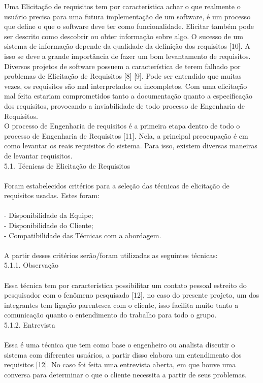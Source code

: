 \tab Uma Elicitação de requisitos tem por característica achar o que realmente o usuário precisa para uma futura implementação de um software, é um processo que define o que o software deve ter como funcionalidade. Elicitar também pode ser descrito como descobrir ou obter informação sobre algo. O sucesso de um sistema de informação depende da qualidade da definição dos requisitos [10]. A isso se deve a grande importância de fazer um bom levantamento de requisitos.\\
\tab Diversos projetos de software possuem a característica de terem falhado por problemas de Elicitação de Requisitos [8] [9]. Pode ser entendido que muitas vezes, os requisitos são mal interpretados ou incompletos. Com uma elicitação mal feita estariam comprometidos tanto a documentação quanto a especificação dos requisitos, provocando a inviabilidade de todo processo de Engenharia de Requisitos.\\
\tab O processo de Engenharia de requisitos é a primeira etapa dentro de todo o processo de Engenharia de Requisitos [11]. Nela, a principal preocupação é em como levantar os reais requisitos do sistema. Para isso, existem diversas maneiras de levantar requisitos. \\

{\large{5.1. Técnicas de Elicitação de Requisitos}}\\ \\
\tab Foram estabelecidos critérios para a seleção das técnicas de elicitação de requisitos usadas. Estes foram:\\ \\
\tab - Disponibilidade da Equipe;\\
\tab - Disponibilidade do Cliente;\\
\tab - Compatibilidade das Técnicas com a abordagem.\\ \\
\tab A partir desses critérios serão/foram utilizadas as seguintes técnicas:\\

{\large{5.1.1. Observação}}\\ \\
\tab Essa técnica tem por característica possibilitar um contato pessoal estreito do pesquisador com o fenômeno pesquisado [12], no caso do presente projeto, um dos integrantes tem ligação parentesca com o cliente, isso facilita muito tanto a comunicação quanto o entendimento do trabalho para todo o grupo.\\

{\large{5.1.2. Entrevista}\\ \\}
\tab Essa é uma técnica que tem como base o engenheiro ou analista discutir o sistema com diferentes usuários, a partir disso elabora um entendimento dos requisitos [12]. No caso foi feita uma entrevista aberta, em que houve uma conversa para determinar o que o cliente necessita a partir de seus problemas.\\

